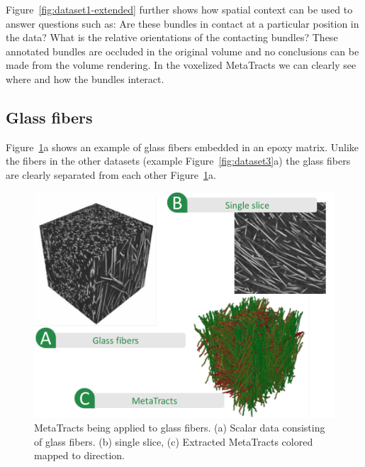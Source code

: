 Figure~\ref{fig:dataset1-extended} further shows how spatial context can be used to answer questions such as:  Are these bundles in contact at a particular position in the data? What is the relative orientations of the contacting bundles? These annotated bundles are occluded in the original volume and no conclusions can be made from the volume rendering. In the voxelized MetaTracts we can clearly see where and how the bundles interact.
\subsection{Glass fibers}
Figure~\ref{fig:glass_fibers}a shows an example of glass fibers embedded in an epoxy matrix. Unlike the fibers in the other datasets (example Figure~\ref{fig:dataset3}a) the glass fibers are clearly separated from each other Figure~\ref{fig:glass_fibers}a.
\begin{figure}
	\centering
	\includegraphics[width=\linewidth]{images_pvis/glass-fibers}
	\caption{MetaTracts being applied to glass fibers. (a) Scalar data consisting of glass fibers. (b) single slice, (c) Extracted MetaTracts colored mapped to direction.}
	\label{fig:glass_fibers}
	\end{figure}

